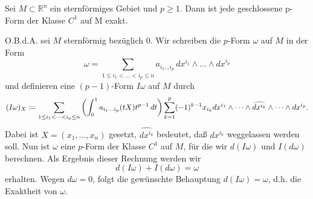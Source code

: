 \documentclass[a4paper,twoside,DIV15,BCOR12mm]{scrbook}
\begin{document}
\bigskip

\begin{satz}[Poincar\'{e}]\label{Satz3.4.4}  {Sei $M \subset {\mathbb 
R}^{n}$ ein sternförmiges Gebiet und $p\ge 1$. Dann ist jede geschlossene p-Form 
der Klasse $C^{1}$ auf M exakt.}
\end{satz}

\bigskip

 O.B.d.A. sei $M$ sternförmig bezüglich $0$. 
Wir schreiben die $p$-Form $\omega$ auf $M$ in der Form
\[ \omega = \sum_{1 \le i_{1} < \dots < i_{p} \le n} a_{i_{1} \dots 
i_{p}} \, dx^{i_1} \wedge \dots \wedge dx^{i_p} \]
und definieren eine $(p-1)$-Form $I\omega$ auf $M$ durch
\[ (I\omega)_{X} \da  \sum_{1 \le i_{1} < \dots < i_{p} \le n} 
\left(\int_{0}^{1} a_{i_{1} \dots i_{p}} (tX) t^{p-1}\, dt \right) 
\sum_{k=1}^{p} (-1)^{k-1} x_{i_k} dx^{i_{1}} \wedge \dots \wedge 
\widehat{dx^{i_k}} \wedge \dots \wedge dx^{i_p}. \]
Dabei ist $X = (x_{1},\dots,x_{n})$ gesetzt, $\widehat{dx^{i_k}}$ 
bedeutet, daß $dx^{i_k}$ weggelassen werden soll. Nun ist $\omega$ 
eine $p$-Form der Klasse $C^{1}$ auf $M$, für die wir $d(I\omega)$ 
und $I(d\omega)$ berechnen. Als Ergebnis dieser Rechnung werden wir
\begin{equation}\label{3.4.5}
d(I\omega) + I(d\omega) = \omega
\end{equation}
erhalten. Wegen $d\omega = 0$, folgt die gewünschte Behauptung 
$d(I\omega) = \omega$, d.h. die Exaktheit von $\omega$.\\
\end{document}
